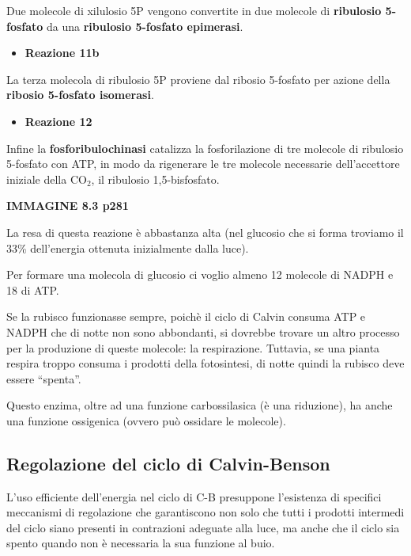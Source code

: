 \documentclass[]{article}
\begin{document}
Due molecole di xilulosio 5P vengono convertite in due molecole di
\textbf{ribulosio 5-fosfato} da una \textbf{ribulosio 5-fosfato
epimerasi}.

\begin{itemize}
\itemsep1pt\parskip0pt
\item
  \textbf{Reazione 11b}
\end{itemize}

La terza molecola di ribulosio 5P proviene dal ribosio 5-fosfato per
azione della \textbf{ribosio 5-fosfato isomerasi}.

\begin{itemize}
\itemsep1pt\parskip0pt
\item
  \textbf{Reazione 12}
\end{itemize}

Infine la \textbf{fosforibulochinasi} catalizza la fosforilazione di tre
molecole di ribulosio 5-fosfato con ATP, in modo da rigenerare le tre
molecole necessarie dell'accettore iniziale della CO$_2$, il ribulosio
1,5-bisfosfato.

\textbf{IMMAGINE 8.3 p281}

La resa di questa reazione è abbastanza alta (nel glucosio che si forma
troviamo il 33\% dell'energia ottenuta inizialmente dalla luce).

Per formare una molecola di glucosio ci voglio almeno 12 molecole di
NADPH e 18 di ATP.

Se la rubisco funzionasse sempre, poichè il ciclo di Calvin consuma ATP
e NADPH che di notte non sono abbondanti, si dovrebbe trovare un altro
processo per la produzione di queste molecole: la respirazione.
Tuttavia, se una pianta respira troppo consuma i prodotti della
fotosintesi, di notte quindi la rubisco deve essere ``spenta''.

Questo enzima, oltre ad una funzione carbossilasica (è una riduzione),
ha anche una funzione ossigenica (ovvero può ossidare le molecole).

\subsection{Regolazione del ciclo di
Calvin-Benson}\label{regolazione-del-ciclo-di-calvin-benson}

L'uso efficiente dell'energia nel ciclo di C-B presuppone l'esistenza di
specifici meccanismi di regolazione che garantiscono non solo che tutti
i prodotti intermedi del ciclo siano presenti in contrazioni adeguate
alla luce, ma anche che il ciclo sia spento quando non è necessaria la
sua funzione al buio.
\end{document}
